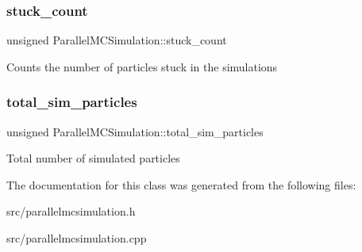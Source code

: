 \subsubsection{\texorpdfstring{stuck\+\_\+count}{stuck\_count}}
{\footnotesize\ttfamily unsigned Parallel\+M\+C\+Simulation\+::stuck\+\_\+count}

Counts the number of particles stuck in the simulations \mbox{\label{class_parallel_m_c_simulation_a18326e05c32fac82264d7351d78a7433}} 
\subsubsection{\texorpdfstring{total\+\_\+sim\+\_\+particles}{total\_sim\_particles}}
{\footnotesize\ttfamily unsigned Parallel\+M\+C\+Simulation\+::total\+\_\+sim\+\_\+particles}

Total number of simulated particles 

The documentation for this class was generated from the following files\+:\begin{DoxyCompactItemize}
\item 
src/parallelmcsimulation.\+h\item 
src/parallelmcsimulation.\+cpp\end{DoxyCompactItemize}
